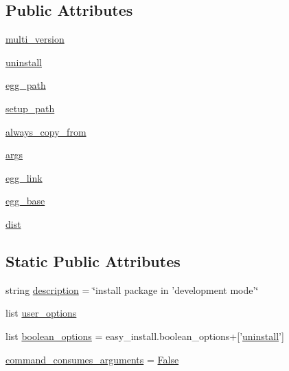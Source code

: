 \subsection*{Public Attributes}
\begin{DoxyCompactItemize}
\item 
\hyperlink{classsetuptools_1_1command_1_1develop_1_1develop_ab58617aafb9fd2d0bd6f86c5b0c88b6b}{multi\+\_\+version}
\item 
\hyperlink{classsetuptools_1_1command_1_1develop_1_1develop_a40763517d7b5632fc6b6cec1838789c7}{uninstall}
\item 
\hyperlink{classsetuptools_1_1command_1_1develop_1_1develop_a00b4e23b88ef9ea02cd228ec7f17f3bd}{egg\+\_\+path}
\item 
\hyperlink{classsetuptools_1_1command_1_1develop_1_1develop_aebd7d6fb89f85612802017ae8913a34f}{setup\+\_\+path}
\item 
\hyperlink{classsetuptools_1_1command_1_1develop_1_1develop_a964d71769a4edaf14101e17649670ef2}{always\+\_\+copy\+\_\+from}
\item 
\hyperlink{classsetuptools_1_1command_1_1develop_1_1develop_af5f6f07fcb7884261ca12f7e12d93c09}{args}
\item 
\hyperlink{classsetuptools_1_1command_1_1develop_1_1develop_a6025e993026dbb3bc7922c1b61459d38}{egg\+\_\+link}
\item 
\hyperlink{classsetuptools_1_1command_1_1develop_1_1develop_a09767fa04a16fe9a2f8d2dc828391b3f}{egg\+\_\+base}
\item 
\hyperlink{classsetuptools_1_1command_1_1develop_1_1develop_afe57f6e30fcbd487d024ab2dfa587630}{dist}
\end{DoxyCompactItemize}
\subsection*{Static Public Attributes}
\begin{DoxyCompactItemize}
\item 
string \hyperlink{classsetuptools_1_1command_1_1develop_1_1develop_ad0b736c0b475d9b6e91f3a2007950eca}{description} = \char`\"{}install package in 'development mode'\char`\"{}
\item 
list \hyperlink{classsetuptools_1_1command_1_1develop_1_1develop_a94b9fe3f4c5212fa175e8927562a77bf}{user\+\_\+options}
\item 
list \hyperlink{classsetuptools_1_1command_1_1develop_1_1develop_ad4ba75ee6b4349f1b969ea9e9e11a53b}{boolean\+\_\+options} = easy\+\_\+install.\+boolean\+\_\+options+\mbox{[}'\hyperlink{classsetuptools_1_1command_1_1develop_1_1develop_a40763517d7b5632fc6b6cec1838789c7}{uninstall}'\mbox{]}
\item 
\hyperlink{classsetuptools_1_1command_1_1develop_1_1develop_af26405dfc9f37ec28fbae36dc354e0c2}{command\+\_\+consumes\+\_\+arguments} = \hyperlink{libqhull_8h_a306ebd41c0cd1303b1372c6153f0caf8}{False}
\end{DoxyCompactItemize}


